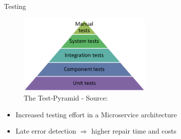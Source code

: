 \documentclass{beamer}
\begin{document}
\begin{frame}{}
  \vspace{-0.5cm}
  \begin{center}
    \Large Testing
  \end{center}

  \vspace{-0.5cm}
  \begin{figure}
    \includegraphics[width=0.58\textwidth]{img/tests-pyramid.png}
    \caption{\footnotesize The Test-Pyramid - \textcolor{uos-grey-full}{Source: {\cite{microtest}}}}
  \end{figure}
  \vspace{-0.2cm}
  \begin{block}{}
    \begin{itemize}
      \small
      \setlength\itemsep{0em}
      \item Increased testing effort in a Microservice architecture
      \item Late error detection \(\Rightarrow \) higher repair time and costs
    \end{itemize}
  \end{block}
\end{frame}
\end{document}
